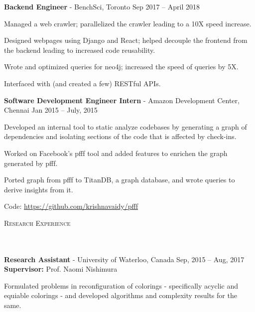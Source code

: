 \documentclass{article}
\newcommand{\header}[1]{{
\hspace*{-15pt}\vspace*{6pt} \textsc{#1}} \vspace*{-6pt} 
\lineunder
}
\newcommand{\lineunder}{
\vspace*{-8pt} \\ \hspace*{-18pt} 
\hrulefill \\
}
\newcommand{\employer}[4]{{
\vspace*{2pt}%
\textbf{#1} - #2 \hfill #3\\ #4 \vspace*{2pt}}
}
\renewcommand{\labelitemii}{
$\vcenter{\hbox{\tiny$\bullet$}}$\hspace*{-3pt}
}
\newenvironment{bullet-list-minor}{
\begin{list}{\labelitemii}{\setlength\leftmargin{15pt} 
\topsep 0pt \itemsep -2pt}}{\vspace*{4pt}\end{list}
}
\begin{document}
    \employer{Backend Engineer}{BenchSci,
        Toronto}{Sep 2017 -- April 2018}{}
	\begin{bullet-list-minor}
	\item Managed a web crawler; parallelized the crawler leading to a 10X speed
increase.
	\item Designed webpages using Django and React; helped decouple the frontend
from the backend leading to increased code reusability.
	\item Wrote and optimized queries for neo4j; increased the speed of
queries by 5X.
	\item Interfaced with (and created a few) RESTful APIs.
    \end{bullet-list-minor}

    \employer{Software Development Engineer Intern}{Amazon Development Center,
        Chennai}{Jan 2015 -- July,
        2015}{}
	\begin{bullet-list-minor}
        \item Developed an internal tool to static analyze codebases by
            generating a graph of dependencies and isolating sections of the
            code that is affected by check-ins.
        \item Worked on Facebook's pfff tool and added features to enrichen the
            graph generated by pfff.
        \item Ported graph from pfff to TitanDB, a graph database, and wrote
            queries to derive insights from it.
        \item Code: \url{https://github.com/krishnavaidy/pfff}
    \end{bullet-list-minor}

\vspace*{4pt}%
\header{Research Experience}
\employer{Research Assistant}{University of Waterloo, Canada}{Sep, 2015 --
      Aug, 2017}{\textbf{Supervisor:} Prof. Naomi Nishimura}
\begin{bullet-list-minor}
\item Formulated problems in reconfiguration of colorings - specifically acyclic
and equiable colorings - and developed algorithms and complexity results for the
same.
\end{bullet-list-minor}
\end{document}

